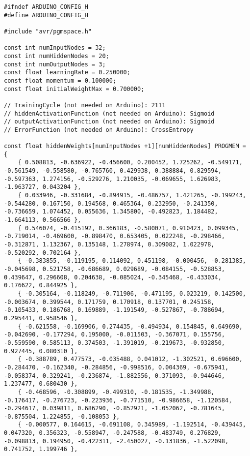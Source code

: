 \documentclass[a4paper]{article}
\begin{document}
\begin{lstlisting}
#ifndef ARDUINO_CONFIG_H
#define ARDUINO_CONFIG_H

#include "avr/pgmspace.h"

const int numInputNodes = 32;
const int numHiddenNodes = 20;
const int numOutputNodes = 3;
const float learningRate = 0.250000;
const float momentum = 0.100000;
const float initialWeightMax = 0.700000;

// TrainingCycle (not needed on Arduino): 2111
// hiddenActivationFunction (not needed on Arduino): Sigmoid
// outputActivationFunction (not needed on Arduino): Sigmoid
// ErrorFunction (not needed on Arduino): CrossEntropy

const float hiddenWeights[numInputNodes +1][numHiddenNodes] PROGMEM = {
    { 0.508813, -0.636922, -0.456600, 0.200452, 1.725262, -0.549171, -0.561549, -0.558580, -0.765760, 0.429938, 0.388884, 0.829594, -0.597363, 1.274156, -0.529276, 1.210035, -0.069655, 1.626983, -1.963727, 0.043204 }, 
    { 0.033946, -0.331684, -0.894915, -0.486757, 1.421265, -0.199243, -0.544280, 0.167150, 0.194568, 0.465364, 0.232950, -0.241350, -0.736659, 1.074452, 0.055636, 1.345800, -0.492823, 1.184482, -1.664113, 0.566566 }, 
    { 0.546074, -0.415192, 0.366183, -0.580071, 0.910423, 0.099345, -0.719014, -0.469600, -0.898470, 0.653405, 0.022248, -0.298466, -0.312871, 1.132367, 0.135148, 1.278974, 0.309082, 1.022978, -0.520292, 0.702164 }, 
    { -0.383855, -0.119195, 0.114092, 0.451198, -0.000456, -0.281385, -0.045698, 0.521758, -0.686689, 0.029689, -0.084155, -0.528853, 0.439647, 0.296608, 0.204638, -0.085024, -0.345468, -0.433034, 0.176622, 0.844925 }, 
    { -0.305164, -0.118249, -0.711906, -0.471195, 0.023219, 0.142500, -0.003674, 0.399544, 0.171759, 0.170918, 0.137701, 0.245158, -0.105433, 0.186768, 0.169889, -1.191549, -0.527867, -0.788694, 0.295441, 0.958546 }, 
    { -0.621558, -0.169906, 0.274435, -0.494934, 0.154845, 0.649690, -0.042690, -0.177294, 0.195000, -0.011503, -0.367071, 0.155756, -0.559590, 0.585113, 0.374503, -1.391019, -0.219673, -0.932850, 0.927445, 0.080310 }, 
    { -0.388789, 0.477573, -0.035488, 0.041012, -1.302521, 0.696600, -0.284470, -0.162340, -0.284856, -0.998516, 0.004369, -0.675941, -0.058374, 0.329241, -0.236874, -1.882556, 0.371093, -0.944646, 1.237477, 0.680430 }, 
    { -0.468596, -0.308899, -0.499310, -0.181535, -1.349988, -0.176417, -0.276723, -0.223936, -0.771510, -0.986658, -1.120584, -0.294617, 0.039811, 0.686290, -0.852921, -1.052062, -0.781645, -0.875504, 1.224855, -0.108053 }, 
    { -0.000577, 0.164615, -0.691108, 0.345989, -1.192514, -0.439445, 0.047320, 0.356323, -0.558947, -0.247588, -0.483749, 0.276829, -0.098813, 0.194950, -0.422311, -2.450027, -0.131836, -1.522098, 0.741752, 1.199746 }, 

\end{lstlisting}
\end{document}
